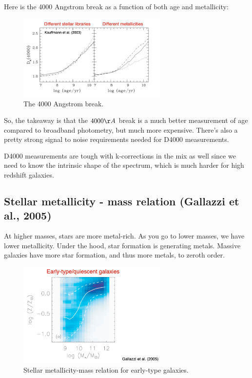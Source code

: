 \documentclass{article}
\begin{document}
Here is the 4000 Angstrom break as a function of both age and metallicity:

\begin{figure}
    \centering
    \includegraphics[width=0.66\textwidth]{figs/Screen Shot 2021-09-02 at 9.43.15 AM.png}
    \caption{The 4000 Angstrom break. }
    \label{fig:4000angbreak}
\end{figure}

So, the takeaway is that the $4000\AA$ break is a much better measurement of age compared to broadband photometry, but much more expensive. There's also a pretty strong signal to noise requirements needed for D4000 measurements. 

D4000 measurements are tough with k-corrections in the mix as well since we need to know the intrinsic shape of the spectrum, which is much harder for high redshift galaxies. 

\subsection{Stellar metallicity - mass relation (Gallazzi et al., 2005)}

At higher masses, stars are more metal-rich. As you go to lower masses, we have lower metallicity. Under the hood, star formation is generating metals. Massive galaxies have more star formation, and thus more metals, to zeroth order.

\begin{figure}
    \centering
    \includegraphics[width=0.66\textwidth]{figs/Screen Shot 2021-09-02 at 9.43.55 AM.png}
    \caption{Stellar metallicity-mass relation for early-type galaxies.}
    \label{fig:z_m_relation}
\end{figure}
\end{document}
